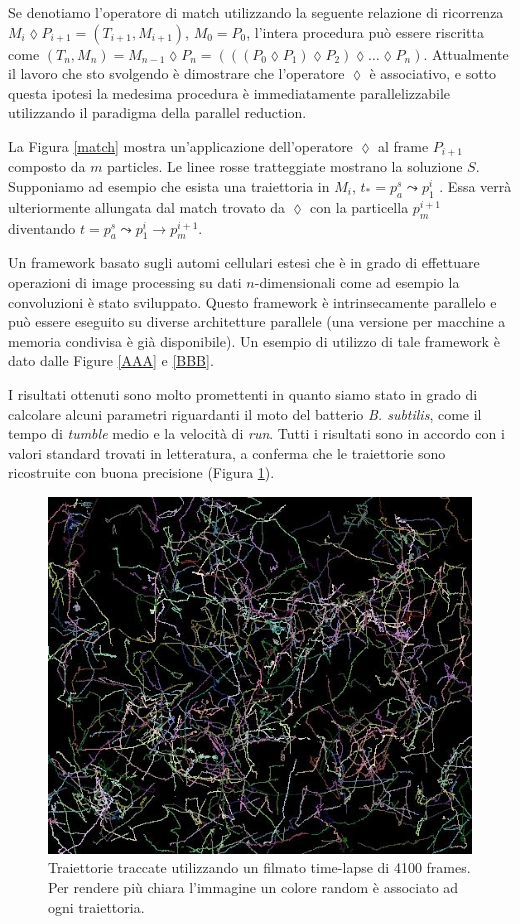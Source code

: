 Se denotiamo  l'operatore di match utilizzando la seguente relazione di ricorrenza $  M_i \lozenge P_{i+1} = (T_{i+1},M_{i+1}) $, $M_0=P_0$, l'intera procedura può essere riscritta come $(T_n,M_n) = M_{n-1} \lozenge P_{n}=(((P_0 \lozenge P_1)\lozenge P_2) \lozenge \ldots \lozenge P_n)$.
Attualmente il lavoro che sto svolgendo è dimostrare che l'operatore $\lozenge $ è associativo, e sotto questa ipotesi la medesima procedura è immediatamente parallelizzabile utilizzando il paradigma della parallel reduction.

La Figura \ref{match} mostra un'applicazione dell'operatore $\lozenge$ al frame $P_{i+1}$ composto da $m$ particles. Le linee rosse tratteggiate mostrano la soluzione $S$.
Supponiamo ad esempio che esista una traiettoria in $M_i$, $t_*=p^s_a \leadsto p^i_1$ . Essa verrà ulteriormente allungata dal match trovato da $\lozenge$ con la particella $p^{i+1}_m$ diventando $t=p^s_a \leadsto p^i_1 \to p^{i+1}_m$.

Un framework basato sugli automi cellulari estesi che è in grado di effettuare operazioni di image processing su dati $n$-dimensionali come ad esempio la convoluzioni è stato sviluppato. Questo framework è intrinsecamente parallelo e può essere eseguito su diverse architetture parallele (una versione per macchine a memoria condivisa è già disponibile). Un esempio di utilizzo di tale framework è dato dalle Figure \ref{AAA} e \ref{BBB}.

I risultati ottenuti sono molto promettenti in quanto siamo stato in grado di calcolare alcuni parametri riguardanti il moto del batterio \textit{B. subtilis}, come il tempo di \textit{tumble} medio e la velocità di \textit{run}. 
Tutti i risultati sono in accordo con i valori standard trovati in letteratura, a conferma che le traiettorie sono ricostruite con buona precisione (Figura \ref{fig:res}).

\begin{figure}[!htbp]
	\begin{center}
		\includegraphics[scale=0.75]{images/result.png}
		\caption{Traiettorie traccate utilizzando un filmato time-lapse di 4100 frames. Per rendere più chiara l'immagine un colore random è associato ad ogni traiettoria.}\label{fig:res}
	\end{center}
\end{figure}
